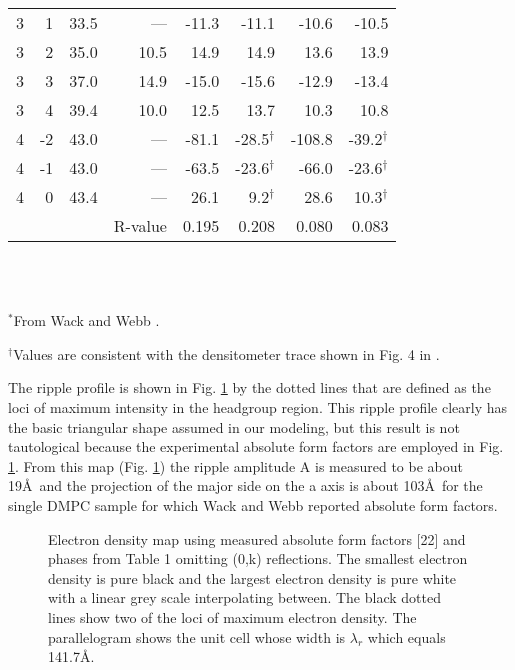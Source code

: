 \begin{table}
{\begin{tabular}{rrrrrrrr}
3 &   1 & 33.5  &  ---  &  -11.3  & -11.1 & -10.6 &  -10.5 \\
3 &   2 & 35.0  &  10.5  &  14.9  & 14.9 & 13.6 &  13.9 \\
3 &   3 & 37.0  &  14.9  &  -15.0  & -15.6 & -12.9 &  -13.4 \\
3 &   4 & 39.4  &  10.0  &  12.5  & 13.7 & 10.3 &  10.8 \\
4 &  -2 & 43.0  &  ---  &  -81.1  & -28.5$^{\dag}$ & -108.8 &  -39.2$^{\dag}$ \\
4 &  -1 & 43.0  &  ---  &  -63.5  & -23.6$^{\dag}$ & -66.0 &  -23.6$^{\dag}$ \\
4 &   0 & 43.4  &  ---  &  26.1  & 9.2$^{\dag}$ & 28.6 &  10.3$^{\dag}$ \\ 
\hline
 & & & R-value & 0.195 & 0.208 & 0.080 & 0.083 \\ \hline
\end{tabular}
}
\\~\\
{\small
\indent $^{*}$From Wack and Webb \cite{Wac89a}.

\indent $^{\dag}$Values are consistent with the densitometer trace shown in 
        Fig. 4 in \cite{Wac89a}.
}
\end{table}

The ripple profile is shown in Fig. \ref{wack_map} by the dotted lines
that are defined as the loci of maximum intensity in the headgroup
region. This ripple profile clearly has the basic triangular shape
assumed in our modeling, but this result is not tautological because 
the experimental absolute form factors are employed in Fig. \ref{wack_map}.
From this map (Fig. \ref{wack_map}) the ripple amplitude A is measured
to be about 19\AA\ and the projection of the major side on the a axis is 
about 103\AA\ for the single DMPC sample for which Wack and Webb \cite{Wac89a}
reported absolute form factors.

\begin{figure}
\centerline {}
\caption{
Electron density map using measured absolute form factors 
[22] and phases from Table 1 omitting (0,k) reflections.  The smallest 
electron density is pure black and the largest electron density is pure 
white with a linear grey scale interpolating between.  The black dotted 
lines show two of the loci of maximum electron density. 
The parallelogram shows the unit cell whose width is $\lambda_r$ 
which equals 141.7\AA.
\label{wack_map}}
\end{figure}

